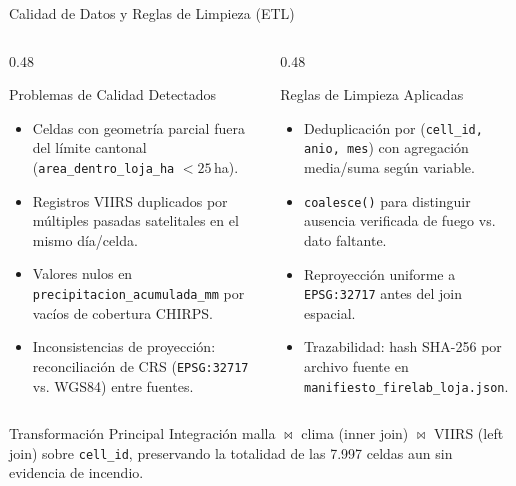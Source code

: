 \documentclass[aspectratio=169,11pt]{beamer}
\begin{document}
\begin{frame}{Calidad de Datos y Reglas de Limpieza (ETL)}
  \begin{columns}[t]
    \begin{column}{0.48\textwidth}
      \begin{block}{Problemas de Calidad Detectados}
        \begin{itemize}\small
          \item Celdas con geometr\'ia parcial fuera del l\'imite cantonal (\texttt{area\_dentro\_loja\_ha} $< 25$\,ha).
          \item Registros VIIRS duplicados por m\'ultiples pasadas satelitales en el mismo d\'ia/celda.
          \item Valores nulos en \texttt{precipitacion\_acumulada\_mm} por vac\'ios de cobertura CHIRPS.
          \item Inconsistencias de proyecci\'on: reconciliaci\'on de CRS (\texttt{EPSG:32717} vs. WGS84) entre fuentes.
        \end{itemize}
      \end{block}
    \end{column}
    \begin{column}{0.48\textwidth}
      \begin{exampleblock}{Reglas de Limpieza Aplicadas}
        \begin{itemize}\small
          \item Deduplicaci\'on por (\texttt{cell\_id, anio, mes}) con agregaci\'on media/suma seg\'un variable.
          \item \texttt{coalesce()} para distinguir ausencia verificada de fuego vs. dato faltante.
          \item Reproyecci\'on uniforme a \texttt{EPSG:32717} antes del join espacial.
          \item Trazabilidad: hash SHA-256 por archivo fuente en \texttt{manifiesto\_firelab\_loja.json}.
        \end{itemize}
      \end{exampleblock}
    \end{column}
  \end{columns}
  \vspace{0.2cm}
  \begin{alertblock}{Transformaci\'on Principal}
    Integraci\'on malla $\bowtie$ clima (inner join) $\bowtie$ VIIRS (left join) sobre \texttt{cell\_id}, preservando la totalidad de las 7.997 celdas aun sin evidencia de incendio.
  \end{alertblock}
\end{frame}
\end{document}
